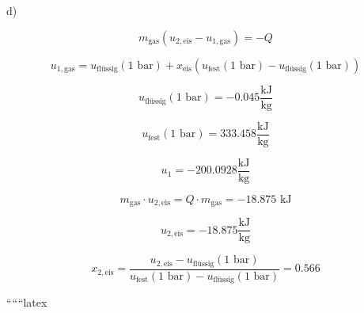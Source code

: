 d)

\[
m_{\text{gas}} (u_{2,\text{eis}} - u_{1,\text{gas}}) = -Q
\]

\[
u_{1,\text{gas}} = u_{\text{flüssig}} (1 \text{ bar}) + x_{\text{eis}} (u_{\text{fest}} (1 \text{ bar}) - u_{\text{flüssig}} (1 \text{ bar}))
\]

\[
u_{\text{flüssig}} (1 \text{ bar}) = -0.045 \frac{\text{kJ}}{\text{kg}}
\]

\[
u_{\text{fest}} (1 \text{ bar}) = 333.458 \frac{\text{kJ}}{\text{kg}}
\]

\[
u_1 = -200.0928 \frac{\text{kJ}}{\text{kg}}
\]

\[
m_{\text{gas}} \cdot u_{2,\text{eis}} = Q \cdot m_{\text{gas}} = -18.875 \text{ kJ}
\]

\[
u_{2,\text{eis}} = -18.875 \frac{\text{kJ}}{\text{kg}}
\]

\[
x_{2,\text{eis}} = \frac{u_{2,\text{eis}} - u_{\text{flüssig}} (1 \text{ bar})}{u_{\text{fest}} (1 \text{ bar}) - u_{\text{flüssig}} (1 \text{ bar})} = 0.566
\]

``````latex


